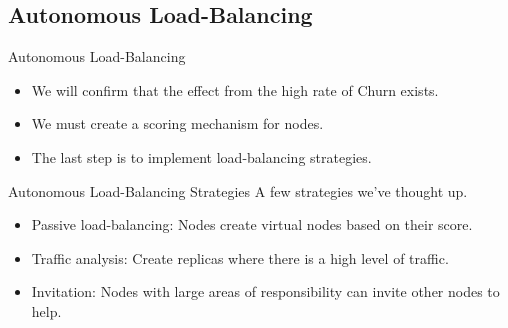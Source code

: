 \documentclass[11pt]{beamer}
\begin{document}
\subsection{Autonomous Load-Balancing}
\begin{frame}{Autonomous Load-Balancing}
	\begin{itemize}
		\item We will confirm that the effect from the high rate of Churn exists.
		\item We must create a scoring mechanism for nodes.
		\item The last step is to implement load-balancing strategies.
	\end{itemize}
\end{frame}

\begin{frame}{Autonomous Load-Balancing Strategies}
	A few strategies we've thought up.
	\begin{itemize}
		\item Passive load-balancing: Nodes create virtual nodes based on their score.
		\item Traffic analysis:  Create replicas where there is a high level of traffic.
		\item Invitation:  Nodes with large areas of responsibility can invite other nodes to help.
		
	\end{itemize}
\end{frame}
\end{document}

